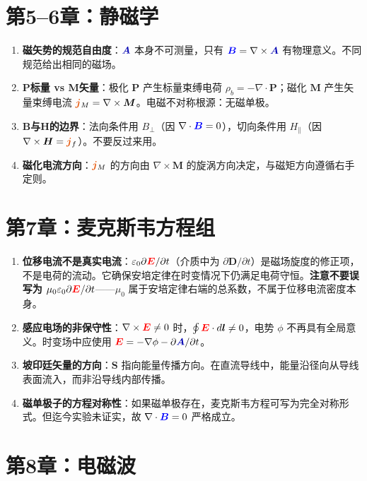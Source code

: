 \documentclass[11pt,a4paper,openany,oneside]{book}
\newcommand{\vecE}{\textcolor{red}{\vect{E}}}
\newcommand{\vecB}{\textcolor{blue}{\vect{B}}}
\newcommand{\vecJ}{\textcolor{cororange}{\vect{j}}}
\newcommand{\vecA}{\textcolor{blue!70!black}{\vect{A}}}
\newcommand{\eps}{\varepsilon}
\newcommand{\muz}{\mu_0}
\newcommand{\vect}[1]{\bm{#1}}
\newcommand{\curl}{\nabla\times}
\newcommand{\divg}{\nabla\cdot}
\begin{document}
\section{第5--6章：静磁学}

\begin{enumerate}
\item \textbf{磁矢势的规范自由度}：$\vecA$ 本身不可测量，只有 $\vecB=\curl\vecA$ 有物理意义。不同规范给出相同的磁场。
\item \textbf{P标量 vs M矢量}：极化 $\vect{P}$ 产生标量束缚电荷 $\rho_b=-\nabla\cdot\vect{P}$；磁化 $\vect{M}$ 产生矢量束缚电流 $\vecJ_M=\nabla\times\vect{M}$。电磁不对称根源：无磁单极。
\item \textbf{B与H的边界}：法向条件用 $B_\perp$（因 $\divg\vecB=0$），切向条件用 $H_\parallel$（因 $\curl\vect{H}=\vecJ_f$）。不要反过来用。
\item \textbf{磁化电流方向}：$\vecJ_M$ 的方向由 $\nabla\times\vect{M}$ 的旋涡方向决定，与磁矩方向遵循右手定则。
\end{enumerate}

\section{第7章：麦克斯韦方程组}

\begin{enumerate}
\item \textbf{位移电流不是真实电流}：$\eps_0\partial\vecE/\partial t$（介质中为 $\partial\vect{D}/\partial t$）是磁场旋度的修正项，不是电荷的流动。它确保安培定律在时变情况下仍满足电荷守恒。\textbf{注意不要误写为 $\muz\eps_0\partial\vecE/\partial t$}——$\muz$ 属于安培定律右端的总系数，不属于位移电流密度本身。
\item \textbf{感应电场的非保守性}：$\curl\vecE\neq 0$ 时，$\oint\vecE\cdot d\vect{l}\neq 0$，电势 $\phi$ 不再具有全局意义。时变场中应使用 $\vecE=-\nabla\phi-\partial\vecA/\partial t$。
\item \textbf{坡印廷矢量的方向}：$\vect{S}$ 指向能量传播方向。在直流导线中，能量沿径向从导线表面流入，而非沿导线内部传播。
\item \textbf{磁单极子的方程对称性}：如果磁单极存在，麦克斯韦方程可写为完全对称形式。但迄今实验未证实，故 $\divg\vecB=0$ 严格成立。
\end{enumerate}

\section{第8章：电磁波}
\end{document}

